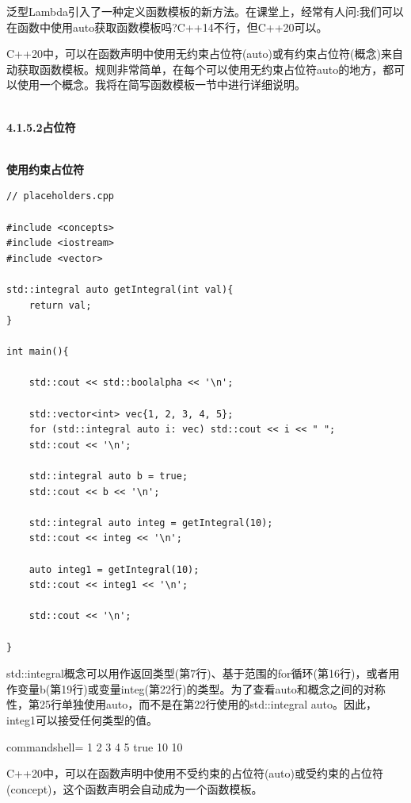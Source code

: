 泛型Lambda引入了一种定义函数模板的新方法。在课堂上，经常有人问:我们可以在函数中使用auto获取函数模板吗?C++14不行，但C++20可以。

C++20中，可以在函数声明中使用无约束占位符(auto)或有约束占位符(概念)来自动获取函数模板。规则非常简单，在每个可以使用无约束占位符auto的地方，都可以使用一个概念。我将在简写函数模板一节中进行详细说明。

\hspace*{\fill} \\ %
\noindent
\textbf{4.1.5.2\hspace{0.2cm}占位符}

\hspace*{\fill} \\ %
\noindent
\textbf{使用约束占位符}
\begin{lstlisting}[style=styleCXX]
// placeholders.cpp

#include <concepts>
#include <iostream>
#include <vector>

std::integral auto getIntegral(int val){
	return val;
}

int main(){

	std::cout << std::boolalpha << '\n';

	std::vector<int> vec{1, 2, 3, 4, 5};
	for (std::integral auto i: vec) std::cout << i << " ";
	std::cout << '\n';

	std::integral auto b = true;
	std::cout << b << '\n';

	std::integral auto integ = getIntegral(10);
	std::cout << integ << '\n';

	auto integ1 = getIntegral(10);
	std::cout << integ1 << '\n';

	std::cout << '\n';

}
\end{lstlisting}

std::integral概念可以用作返回类型(第7行)、基于范围的for循环(第16行)，或者用作变量b(第19行)或变量integ(第22行)的类型。为了查看auto和概念之间的对称性，第25行单独使用auto，而不是在第22行使用的std::integral auto。因此，integ1可以接受任何类型的值。

\begin{tcblisting}{commandshell={}}
1 2 3 4 5
true
10
10
\end{tcblisting}


C++20中，可以在函数声明中使用不受约束的占位符(auto)或受约束的占位符(concept)，这个函数声明会自动成为一个函数模板。

